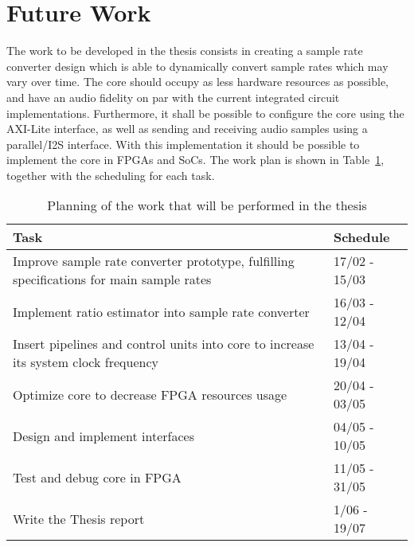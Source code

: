 \section{Future Work}
\label{section:future}

The work to be developed in the thesis consists in creating a sample rate
converter design which is able to dynamically convert sample rates which may vary
over time. The core should occupy as less hardware resources as possible, and
have an audio fidelity on par with the current integrated circuit
implementations. Furthermore, it shall be possible to configure the core using
the AXI-Lite interface, as well as sending and receiving audio samples using a
parallel/I2S interface. With this implementation it should be possible to
implement the core in FPGAs and SoCs. The work plan is shown in
Table~\ref{tab:planning}, together with the scheduling for each task.

\begin{table}[!htbp]
	\centering
	\caption{Planning of the work that will be performed in the thesis}
	\label{tab:planning}
	\begin{tabular}{|p{8cm}|l|}
		\hline
		\textbf{Task}                                                                            & \textbf{Schedule} \\
		\hline
		Improve sample rate converter prototype, fulfilling specifications for main sample rates          & 17/02 - 15/03       \\
		\hline
		Implement ratio estimator into sample rate converter                                              & 16/03 - 12/04       \\
		\hline
		Insert pipelines and control units into core to increase its system clock frequency               & 13/04 - 19/04       \\
		\hline
		Optimize core to decrease FPGA resources usage                                                    & 20/04 - 03/05       \\
		\hline
		Design and implement interfaces                                                               & 04/05 - 10/05       \\
		\hline
		Test and debug core in FPGA                                                                       & 11/05 - 31/05       \\
		\hline
		Write the Thesis report                                                                           & 1/06 - 19/07       \\
		\hline
	\end{tabular}
\end{table}

